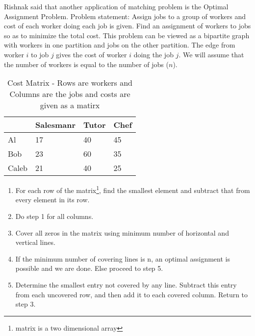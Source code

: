 Rishnak said that another application of matching problem is the Optimal Assignment Problem. 
Problem statement: Assign jobs to a group of workers and cost of each worker doing each job is given. Find an assignment of workers to jobs so as to minimize the total cost. This problem can be viewed as a bipartite graph with workers in one partition and jobs on the other partition. The edge from worker $i$ to job $j$ gives the cost of worker $i$ doing the job $j$.
We will assume that the number of workers is equal to the number of jobs ($n$).
\begin{table}
\begin{center}
\begin{tabular}{ ||p{2cm}||p{2cm}||p{1.5cm} ||p{1.5cm}|| }
 \hline
 
  & Salesmanr&Tutor&Chef\\
 \hline
 Al  & 17   &40&45\\
 Bob& 23&60&35\\
 Caleb&21&40&25\\

 
 \hline
\end{tabular}
\caption{Cost Matrix - Rows are workers and Columns are the jobs and costs are given as a matirx }\label{16t3}
\end{center}
\end{table}

\begin{enumerate}
\item For each row of the matrix\footnote{matrix is a two dimensional array}, find the smallest element and subtract that from every element in its row.
\item Do step 1 for all columns.
\item Cover all zeros in the matrix using minimum number of horizontal  and vertical lines.
\item If the minimum number of covering lines is n, an optimal assignment is possible and we are done. Else  proceed to step 5.
\item Determine the smallest entry not covered by any line. Subtract this entry from each uncovered row, and then add it to each covered column. Return to step 3.
\end{enumerate}

